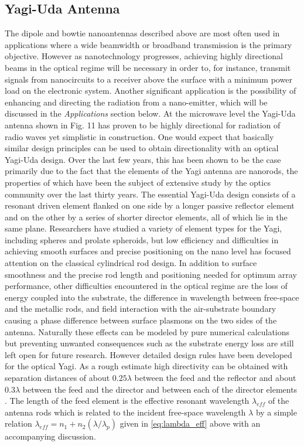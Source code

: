 \documentclass[11pt]{article}
\begin{document}
\subsection{Yagi-Uda Antenna}
%
The dipole and bowtie nanoantennas described above are most often used in applications where a wide beamwidth or broadband transmission is the primary objective. However as nanotechnology progresses, achieving highly directional beams in the optical regime will be necessary in order to, for instance, transmit signals from nanocircuits to a receiver above the surface with a minimum power load on the electronic system. Another significant application is the possibility of enhancing and directing the radiation from a nano-emitter, which will be discussed in the \emph{Applications} section below. At the microwave level the Yagi-Uda antenna shown in Fig. 11 has proven to be highly directional for radiation of radio waves yet simplistic in construction. One would expect that basically similar design principles can be used to obtain directionality with an optical Yagi-Uda design. Over the last few years, this has been shown to be the case primarily due to the fact that the elements of the Yagi antenna are nanorods, the properties of which have been the subject of extensive study by the optics community over the last thirty years.
%
%
%
%
The essential Yagi-Uda design consists of a resonant driven element flanked on one side by a longer passive reflector element and on the other by a series of shorter director elements, all of which lie in the same plane. Researchers have studied a variety of element types for the Yagi, including spheres and prolate spheroids, but low efficiency and difficulties in achieving smooth surfaces and precise positioning on the nano level has focused attention on the classical cylindrical rod design. In addition to surface smoothness and the precise rod length and positioning needed for optimum array performance, other difficulties encountered in the optical regime are the loss of energy coupled into the substrate, the difference in wavelength between free-space and the metallic rods, and field interaction with the air-substrate boundary causing a phase difference between surface plasmons on the two sides of the antenna. Naturally these effects can be modeled by pure numerical calculations but preventing unwanted consequences such as the substrate energy loss are still left open for future research. However detailed design rules have been developed
\cite{Hofmann2007} for the optical Yagi. As a rough estimate high directivity can be obtained with separation distances of about $0.25 \lambda$ between the feed and the reflector and about $0.3 \lambda$ between the feed and the director and between each of the director elements \cite{Kosako2010}. The length of the feed element is the effective resonant wavelength $\lambda_{eff}$ of the antenna rods which is related to the incident free-space wavelength $\lambda$ by a simple relation
$\lambda_{eff} = n_1 + n_2(\lambda/\lambda_p )$ given in \eqref{eq:lambda_eff} above with an accompanying discussion.
\end{document}
